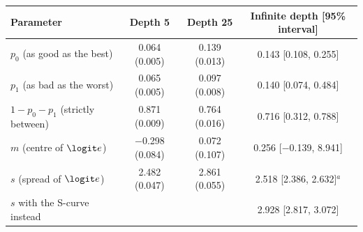 \begin{tabular}{lccc}
\toprule
Parameter & Depth 5 & Depth 25 & Infinite depth [95\% interval] \\
\midrule
$p_0$ (as good as the best) & 0.064 (0.005) & 0.139 (0.013) & 0.143 [0.108, 0.255] \\
$p_1$ (as bad as the worst) & 0.065 (0.005) & 0.097 (0.008) & 0.140 [0.074, 0.484] \\
$1-p_0-p_1$ (strictly between) & 0.871 (0.009) & 0.764 (0.016) & 0.716 [0.312, 0.788] \\
$m$ (centre of $\logit e$) & $-$0.298 (0.084) & 0.072 (0.107) & 0.256 [$-$0.139, 8.941] \\
$s$ (spread of $\logit e$) & 2.482 (0.047) & 2.861 (0.055) & 2.518 [2.386, 2.632]$^{a}$ \\
\quad $s$ with the S-curve instead & & & 2.928 [2.817, 3.072] \\
\bottomrule
\end{tabular}
